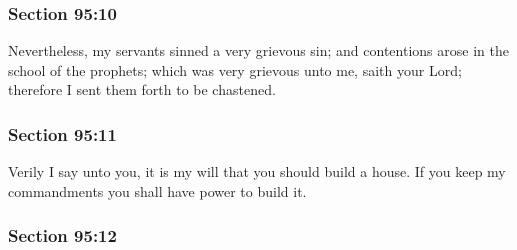 
	\subsubsection{Section 95:10} %
		\label{DC95-10}

		Nevertheless, my servants sinned a very grievous sin; and contentions arose in the school of the prophets; which was very grievous unto me, saith your Lord; therefore I sent them forth to be chastened.


	\subsubsection{Section 95:11} %
		\label{DC95-11}

		Verily I say unto you, it is my will that you should build a house.  If you keep my commandments you shall have power to build it.


	\subsubsection{Section 95:12} %
		\label{DC95-12}

